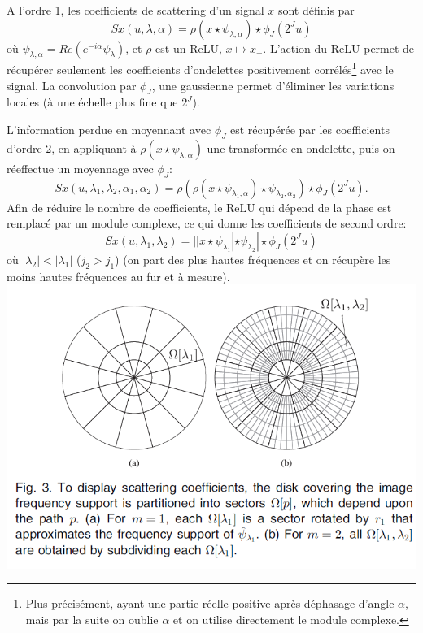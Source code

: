 \documentclass[11pt]{article} %
\begin{document}
\par
A l'ordre 1, les coefficients de scattering d'un signal $x$ sont définis par 
\begin{equation}
	Sx(u,\lambda,\alpha) = \rho(x\star \psi_{\lambda,\alpha})\star \phi_J(2^Ju)
\end{equation}
où $\psi_{\lambda,\alpha} = Re(e^{-i\alpha}\psi_{\lambda})$, et $\rho$ est un ReLU, $x\mapsto x_+$. L'action du ReLU permet de récupérer seulement les coefficients d'ondelettes positivement corrélés\footnote{Plus précisément, ayant une partie réelle positive après déphasage d'angle $\alpha$, mais par la suite on oublie $\alpha$ et on utilise directement le module complexe.} avec le signal. La convolution par $\phi_J$, une gaussienne permet d'éliminer les variations locales (à une échelle plus fine que $2^J$).
\par
L'information perdue en moyennant avec $\phi_J$ est récupérée par les coefficients d'ordre 2, en appliquant à $\rho(x\star\psi_{\lambda,\alpha})$ une transformée en ondelette, puis on réeffectue un moyennage avec $\phi_J$:
\begin{equation}
	Sx(u,\lambda_1, \lambda_2,\alpha_1,\alpha_2) = \rho(\rho(x\star\psi_{\lambda_1, \alpha})\star\psi_{\lambda_2, \alpha_2})\star\phi_J(2^Ju).
\end{equation}
Afin de réduire le nombre de coefficients, le ReLU qui dépend de la phase est remplacé par un module complexe, ce qui donne les coefficients de second ordre:
\begin{equation}
	Sx(u,\lambda_1, \lambda_2) = ||x\star\psi_{\lambda_1}|\star \psi_{\lambda_2}|\star \phi_J(2^Ju)
\end{equation}
où $|\lambda_2|<|\lambda_1|$ ($j_2>j_1$) (on part des plus hautes fréquences et on récupère les moins hautes fréquences au fur et à mesure).
\newline
\includegraphics[width=\textwidth]{scat_coef}
\end{document}
